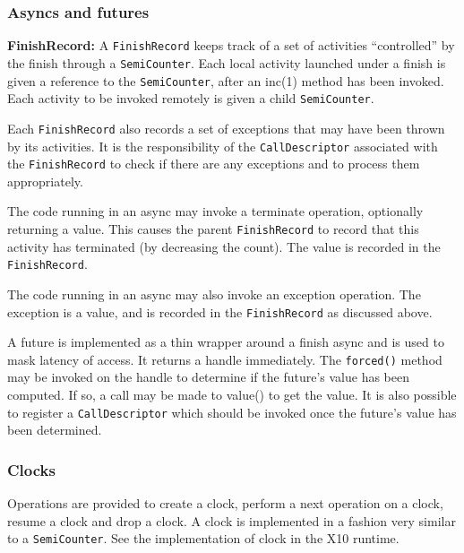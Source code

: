 \subsubsection{Asyncs and futures}

\textbf{FinishRecord:}
 A {\tt FinishRecord} keeps track of a set of activities ``controlled'' by the
 finish through a {\tt SemiCounter}. Each local activity launched under a
 finish is given a reference to the {\tt SemiCounter}, after an inc(1)
 method has been invoked. Each activity to be invoked remotely is given
 a child {\tt SemiCounter}.  

 Each {\tt FinishRecord} also records a set of exceptions that may
 have been thrown by its activities. It is the responsibility of the
 {\tt CallDescriptor} associated with the {\tt FinishRecord} to check
 if there are any exceptions and to process them appropriately.

The code running in an async may invoke a terminate operation,
optionally returning a value. This causes the parent {\tt FinishRecord} to
record that this activity has terminated (by decreasing the
count). The value is recorded in the {\tt FinishRecord}.

The code running in an async may also invoke an exception
operation. The exception is a value, and is recorded in the
{\tt FinishRecord} as discussed above.

A future is implemented as a thin wrapper around a finish async and is
used to mask latency of access.  It returns a handle immediately.  The
{\tt forced()} method may be invoked on the handle to determine if the
future's value has been computed. If so, a call may be made to value()
to get the value. It is also possible to register a {\tt CallDescriptor}
which should be invoked once the future's value has been determined.

\subsubsection{Clocks}
Operations are provided to create a clock, perform a next operation on
a clock, resume a clock and drop a clock. A clock is implemented in a
fashion very similar to a {\tt SemiCounter}. See the implementation of clock
in the X10 runtime.
